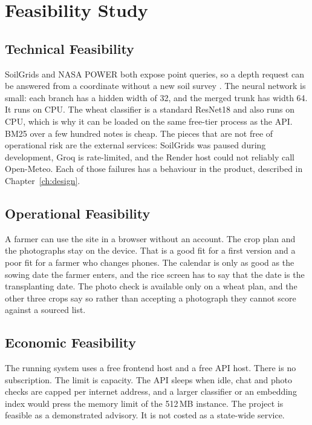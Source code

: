 \label{ch:req}

\section{Feasibility Study}

\subsection{Technical Feasibility}
SoilGrids and NASA POWER both expose point queries, so a depth request can be answered from a coordinate without a new soil survey \cite{poggio2021soilgrids,nasapower}. The neural network is small: each branch has a hidden width of 32, and the merged trunk has width 64. It runs on CPU. The wheat classifier is a standard ResNet18 and also runs on CPU, which is why it can be loaded on the same free-tier process as the API. BM25 over a few hundred notes is cheap. The pieces that are not free of operational risk are the external services: SoilGrids was paused during development, Groq is rate-limited, and the Render host could not reliably call Open-Meteo. Each of those failures has a behaviour in the product, described in Chapter~\ref{ch:design}.

\subsection{Operational Feasibility}
A farmer can use the site in a browser without an account. The crop plan and the photographs stay on the device. That is a good fit for a first version and a poor fit for a farmer who changes phones. The calendar is only as good as the sowing date the farmer enters, and the rice screen has to say that the date is the transplanting date. The photo check is available only on a wheat plan, and the other three crops say so rather than accepting a photograph they cannot score against a sourced list.

\subsection{Economic Feasibility}
The running system uses a free frontend host and a free API host. There is no subscription. The limit is capacity. The API sleeps when idle, chat and photo checks are capped per internet address, and a larger classifier or an embedding index would press the memory limit of the 512\,MB instance. The project is feasible as a demonstrated advisory. It is not costed as a state-wide service.

